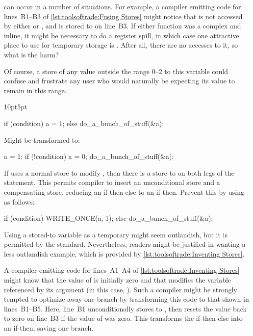 \begin{description}[labelsep=.4em]
\item[Invented stores] can occur in a number of situations.
For example, a compiler emitting code for lines~B1--B3 of
\cref{lst:toolsoftrade:Fusing Stores}
might notice that  is not accessed by either
 or , and is stored to on line~B3.
If either function was a complex and inline, it might be
necessary to do a register spill, in which case one attractive
place to use for temporary storage is .
After all, there are no accesses to it, so what is the harm?

Of course, a store of any value outside the range 0--2 to this variable
could confuse and frustrate any user who would naturally be expecting
its value to remain in this range.

\begin{listing}[tb]
\begin{adjustwidth}{10pt}{5pt}
\footnotesize
\renewcommand{\myfvline}{A\arabic{FancyVerbLine}}
\begin{VerbatimT}
if (condition)
	a = 1;
else
	do_a_bunch_of_stuff(&a);
\end{VerbatimT}
Might be transformed to:
\renewcommand{\myfvline}{B\arabic{FancyVerbLine}}
\begin{VerbatimT}
a = 1;
if (!condition) {
	a = 0;
	do_a_bunch_of_stuff(&a);
}
\end{VerbatimT}
If  uses a normal store to modify , then
there is a store to  on both legs of the  statement.
This permits compiler to insert an unconditional store and a compensating
store, reducing an if-then-else to an if-then.
Prevent this by using  as follows:
\renewcommand{\myfvline}{C\arabic{FancyVerbLine}}
\begin{VerbatimT}
if (condition)
	WRITE_ONCE(a, 1);
else
	do_a_bunch_of_stuff(&a);
\end{VerbatimT}
\end{adjustwidth}
\caption{Inventing Stores}
\label{lst:toolsoftrade:Inventing Stores}
\end{listing}

Using a stored-to variable as a temporary might seem outlandish,
but it is permitted by the standard.
Nevertheless, readers might be justified in wanting a less
outlandish example, which is provided by
\cref{lst:toolsoftrade:Inventing Stores}.

A compiler emitting code for lines~A1--A4 of
\cref{lst:toolsoftrade:Inventing Stores}
might know that the value of  is initially zero and that
 modifies the variable referenced by its
argument (in this case, ).
Such a compiler might be strongly tempted to optimize away one branch
by transforming this code to that shown in lines~B1--B5.
Here, line~B1 unconditionally stores  to , then resets the
value back to zero on line~B3 if the value of  was zero.
This transforms the if-then-else into an if-then, saving one branch.


\end{description}
